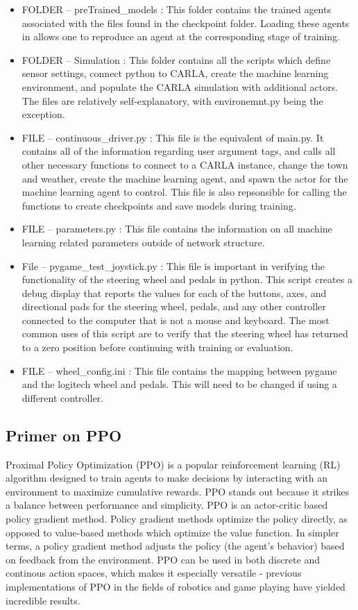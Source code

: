 \documentclass[12pt,oneside,letterpaper]{article}
\begin{document}
\begin{itemize}
\item FOLDER -- preTrained\_models : This folder contains the trained agents associated with the files found in the checkpoint folder. Loading these agents in allows one to reproduce an agent at the corresponding stage of training.
\item FOLDER -- Simulation : This folder contains all the scripts which define sensor settings, connect python to CARLA, create the machine learning environment, and populate the CARLA simulation with additional actors. The files are relatively self-explanatory, with environemnt.py being the exception.
\item FILE -- continuous\_driver.py : This file is the equivalent of main.py. It contains all of the information regarding user argument tags, and calls all other necessary functions to connect to a CARLA instance, change the town and weather, create the machine learning agent, and spawn the actor for the machine learning agent to control. This file is also repsonsible for calling the functions to create checkpoints and save models during training.
\item FILE -- parameters.py : This file contains the information on all machine learning related parameters outside of network structure.
\item File -- pygame\_test\_joystick.py : This file is important in verifying the functionality of the steering wheel and pedals in python. This script creates a debug display that reports the values for each of the buttons, axes, and directional pads for the steering wheel, pedals, and any other controller connected to the computer that is not a mouse and keyboard. The most common uses of this script are to verify that the steering wheel has returned to a zero position before continuing with training or evaluation.
\item FILE -- wheel\_config.ini : This file contains the mapping between pygame and the logitech wheel and pedals. This will need to be changed if using a different controller.

\end{itemize}

\subsection{Primer on PPO}

Proximal Policy Optimization (PPO) is a popular reinforcement learning (RL) algorithm designed to train agents to make decisions by interacting with an environment to maximize cumulative rewards. PPO stands out because it strikes a balance between performance and simplicity. PPO is an actor-critic based  policy gradient method. Policy gradient methods optimize the policy directly, as opposed to value-based methods which optimize the value function. In simpler terms, a policy gradient method adjusts the policy (the agent’s behavior) based on feedback from the environment. PPO can be used in both discrete and continous action spaces, which makes it especially versatile - previous implementations of PPO in the fields of robotics and game playing have yielded incredible results. \\
\end{document}
